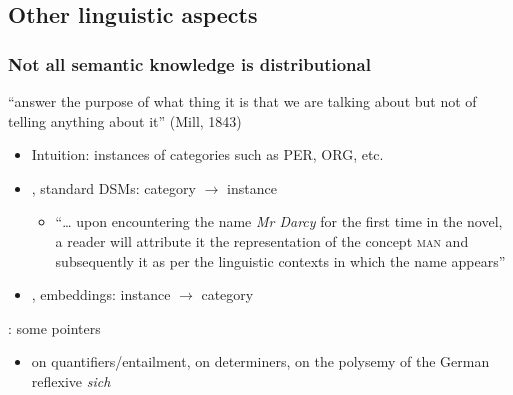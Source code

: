 \documentclass[t]{beamer} %
\begin{document}
\subsection{Other linguistic aspects}		

\begin{frame}
  \frametitle{Not all semantic knowledge is distributional}

   ``answer the purpose of  what thing it is that we are talking about but not of telling anything about it'' (Mill, 1843)
  \begin{itemize}
  \item Intuition: instances of categories such as PER, ORG, etc.
  \item \citet{Herbelot:15}, standard DSMs: category $\rightarrow$ instance
    \begin{itemize}\footnotesize
    \item ``\ldots{} upon encountering
      the name \textit{Mr Darcy} for the first time in the novel, a reader will attribute it the
      representation of the concept \textsc{man} and subsequently  it as per the linguistic contexts in which the name appears''
    \end{itemize}			
  \item \citet{Westera:etc:21}, embeddings: instance $\rightarrow$ category
  \end{itemize}

  \gap[1]
  : some pointers
  \begin{itemize}
  \item \citet{Baroni:etc:12} on quantifiers/entailment, \citet{Bernardi:etc:13} on determiners,  \citet{Pado:Hole:19} on the polysemy of the German reflexive \textit{sich}
  \end{itemize}
\end{frame}
\end{document}
